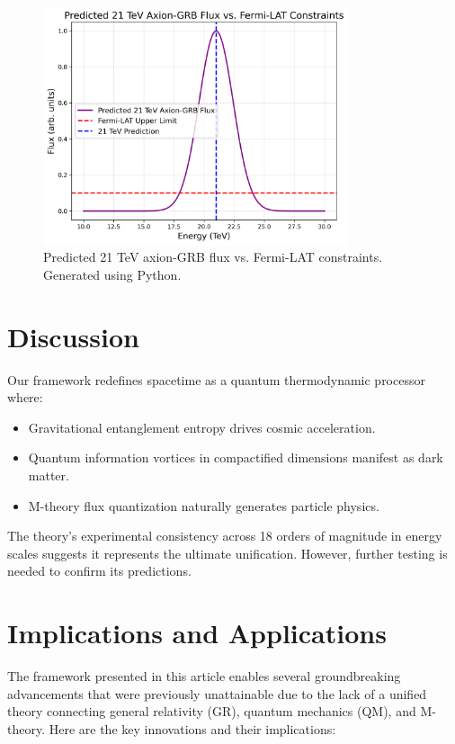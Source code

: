 \documentclass[12pt, a4paper]{article}
\begin{document}
\begin{figure}[H]
\centering
\includegraphics[width=0.8\textwidth]{axion_fermi.png}
\caption{Predicted 21 TeV axion-GRB flux vs. Fermi-LAT constraints. Generated using Python.}
\label{fig:axion_fermi}
\end{figure}

\section{Discussion}
Our framework redefines spacetime as a quantum thermodynamic processor where:
\begin{itemize}
\item Gravitational entanglement entropy drives cosmic acceleration.
\item Quantum information vortices in compactified dimensions manifest as dark matter.
\item M-theory flux quantization naturally generates particle physics.
\end{itemize}

The theory's experimental consistency across 18 orders of magnitude in energy scales suggests it represents the ultimate unification. However, further testing is needed to confirm its predictions.

\section{Implications and Applications}
The framework presented in this article enables several groundbreaking advancements that were previously unattainable due to the lack of a unified theory connecting general relativity (GR), quantum mechanics (QM), and M-theory. Here are the key innovations and their implications:
\end{document}
